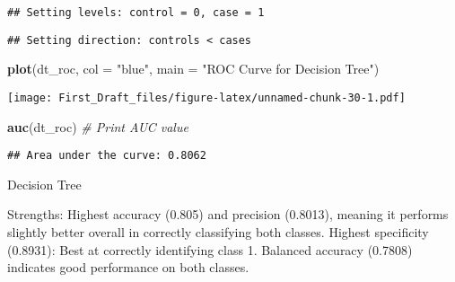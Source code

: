 \documentclass[
]{article}
\newenvironment{Shaded}{\begin{snugshade}}{\end{snugshade}}
\newcommand{\AttributeTok}[1]{\textcolor[rgb]{0.13,0.29,0.53}{#1}}
\newcommand{\CommentTok}[1]{\textcolor[rgb]{0.56,0.35,0.01}{\textit{#1}}}
\newcommand{\DecValTok}[1]{\textcolor[rgb]{0.00,0.00,0.81}{#1}}
\newcommand{\FloatTok}[1]{\textcolor[rgb]{0.00,0.00,0.81}{#1}}
\newcommand{\FunctionTok}[1]{\textcolor[rgb]{0.13,0.29,0.53}{\textbf{#1}}}
\newcommand{\NormalTok}[1]{#1}
\newcommand{\OtherTok}[1]{\textcolor[rgb]{0.56,0.35,0.01}{#1}}
\newcommand{\SpecialCharTok}[1]{\textcolor[rgb]{0.81,0.36,0.00}{\textbf{#1}}}
\newcommand{\StringTok}[1]{\textcolor[rgb]{0.31,0.60,0.02}{#1}}
\begin{document}
\begin{Shaded}
\end{Shaded}

\begin{verbatim}
## Setting levels: control = 0, case = 1
\end{verbatim}

\begin{verbatim}
## Setting direction: controls < cases
\end{verbatim}

\begin{Shaded}
\begin{Highlighting}[]
\FunctionTok{plot}\NormalTok{(dt\_roc, }\AttributeTok{col =} \StringTok{"blue"}\NormalTok{, }\AttributeTok{main =} \StringTok{"ROC Curve for Decision Tree"}\NormalTok{)}
\end{Highlighting}
\end{Shaded}

\texttt{[image: First\_Draft\_files/figure-latex/unnamed-chunk-30-1.pdf]}

\begin{Shaded}
\begin{Highlighting}[]
\FunctionTok{auc}\NormalTok{(dt\_roc)  }\CommentTok{\# Print AUC value}
\end{Highlighting}
\end{Shaded}

\begin{verbatim}
## Area under the curve: 0.8062
\end{verbatim}

Decision Tree

Strengths: Highest accuracy (0.805) and precision (0.8013), meaning it
performs slightly better overall in correctly classifying both classes.
Highest specificity (0.8931): Best at correctly identifying class 1.
Balanced accuracy (0.7808) indicates good performance on both classes.
\end{document}
